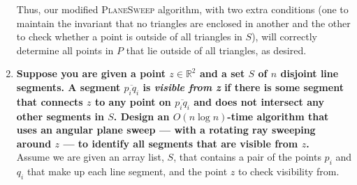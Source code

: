 \documentclass[11pt]{article}
\begin{document}
\begin{enumerate}
    Thus, our modified \textsc{PlaneSweep} algorithm, with two extra conditions (one to maintain the invariant that no triangles are enclosed in another and the other to check whether a point is outside of all triangles in $S$), will correctly determine all points in $P$ that lie outside of all triangles, as desired. 
    
    \newpage

    \item \textbf{Suppose you are given a point $z \in \mathbb{R}^2$ and a set $S$ of $n$ disjoint line segments. A segment $\overline{p_iq_i}$ is \textit{visible from z} if there is some segment that connects $z$ to any point on $\overline{p_iq_i}$ and does not intersect any other segments in $S$. Design an $O(n\log n)$-time algorithm that uses an angular plane sweep — with a rotating ray sweeping around $z$ — to identify all segments that are visible from $z$.} \\

    Assume we are given an array list, $S$, that contains a pair of the points $p_i$ and $q_i$ that make up each line segment, and the point $z$ to check visibility from. 
    


\end{enumerate}
\end{document}
